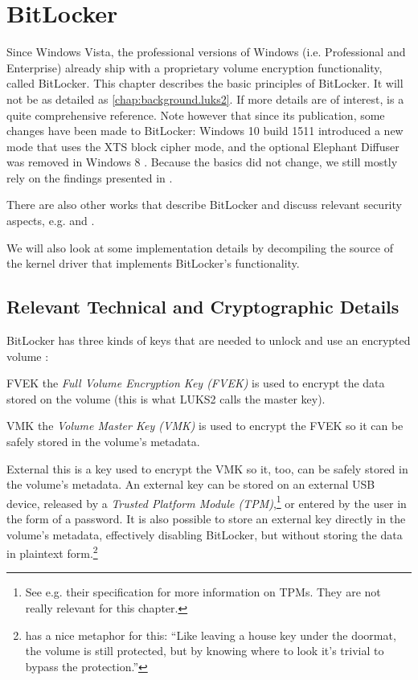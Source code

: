 \section{BitLocker}
\label{chap:otherapproaches.bitlocker}
Since Windows Vista, the professional versions of Windows (i.e. Professional and Enterprise) already ship with a proprietary volume encryption functionality, called BitLocker. This chapter describes the basic principles of BitLocker. It will not be as detailed as \autoref{chap:background.luks2}. If more details are of interest, \cite{Kornblum2009} is a quite comprehensive reference. Note however that since its publication, some changes have been made to BitLocker: Windows 10 build 1511 introduced a new mode that uses the XTS block cipher mode, and the optional Elephant Diffuser was removed in Windows 8 \cite{Sosnowski2016}. Because the basics did not change, we still mostly rely on the findings presented in \cite{Kornblum2009}.

There are also other works that describe BitLocker and discuss relevant security aspects, e.g. \cite{Tuerpe2009} and \cite{Tan2020}.

We will also look at some implementation details by decompiling the source of the kernel driver that implements BitLocker's functionality.

\subsection{Relevant Technical and Cryptographic Details}
\label{chap:otherapproaches.bitlocker.details}
BitLocker has three kinds of keys that are needed to unlock and use an encrypted volume \cite{Kornblum2009}:
\begin{descitemize}
	\item[FVEK] the \emph{Full Volume Encryption Key (FVEK)} is used to encrypt the data stored on the volume (this is what LUKS2 calls the master key).
	\item[VMK] the \emph{Volume Master Key (VMK)} is used to encrypt the FVEK so it can be safely stored in the volume's metadata.
	\item[External] this is a key used to encrypt the VMK so it, too, can be safely stored in the volume's metadata. An external key can be stored on an external USB device, released by a \emph{Trusted Platform Module (TPM)},\footnote{\label{fn:otherapproaches.bitlocker.tpm} See e.g. their specification \cite{Tpm2019} for more information on TPMs. They are not really relevant for this chapter.} or entered by the user in the form of a password. It is also possible to store an external key directly in the volume's metadata, effectively disabling BitLocker, but without storing the data in plaintext form.\footnote{\label{fn:otherapproaches.bitlocker.doormat} \cite{Kornblum2009} has a nice metaphor for this: ``Like leaving a house key under the doormat, the volume is still protected, but by knowing where to look it's trivial to bypass the protection.''}
\end{descitemize}

